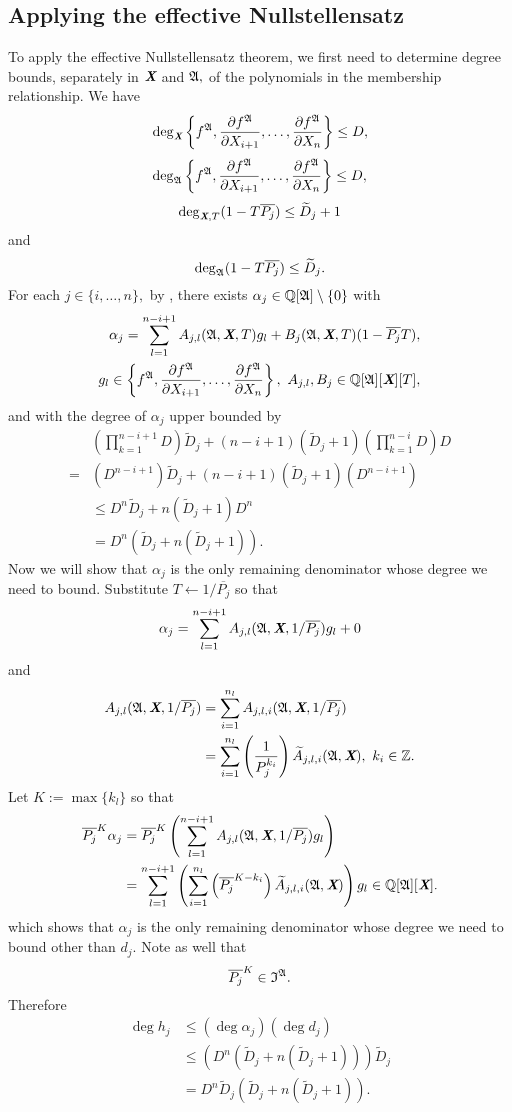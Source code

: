 \documentclass[sigconf]{acmart}
\def\Xb{\textit{\textbf{X}}}
\def\pjb{\overline{P_{j}}}
\def\Q{\mathbb{Q}}
\def\At{\widetilde{A}}
\def\Dt{\widetilde{D}}
\def\I{\frak{I}}
\def\A{\frak{A}}
\begin{document}
\subsection{Applying the effective Nullstellensatz}
%
To apply the effective Nullstellensatz theorem, we first need to determine degree bounds, separately in $\Xb$ and $\A,$ of the polynomials in the membership relationship. We have
\[
\deg_{\Xb}\left\{ 
f^\A,\frac{\partial f^\A}{\partial X_{i+1}},\hdots,\frac{\partial f^\A}{\partial X_n}
\right\}\leq D,
\]
\[
\deg_{\A}  
\left\{ 
f^\A,\frac{\partial f^\A}{\partial X_{i+1}},\hdots,\frac{\partial f^\A}{\partial X_n}
\right\} \leq D,
\]
\[
\deg_{\Xb,T}(1-T\pjb) \leq \Dt_j +1 
\]
and
\[
\deg_{\A}(1-T\pjb) \leq \Dt_j.
\]
For each $j \in \{i,\hdots,n\},$ by \cite[Theorem 0.5]{EN}, there exists $\alpha_j \in \mathbb{Q}[\A]\setminus\{0\}$ with 
%
\begin{align*}
\alpha_j = \sum_{l=1}^{n-i+1} A_{j,l}(\A,\Xb,T)g_l + B_j(\A,\Xb,T)(1-\pjb T), \\ g_l \in 
\left\{ 
f^\A,\frac{\partial f^\A}{\partial X_{i+1}},\hdots,\frac{\partial f^\A}{\partial X_n}
\right\},~ A_{j,l},B_j \in \mathbb{Q}[\A][\Xb][T],
\end{align*}
%
and with the degree of $\alpha_j$ upper bounded by
%
\begin{align*}
    &\left(\prod_{k=1}^{n-i+1} D\right)\Dt_j 
    + (n-i+1)\left(\Dt_j+1\right)\left(\prod_{k=1}^{n-i}D \right)D\\
    = &\left(D^{n-i+1}\right)\Dt_j+
    (n-i+1)\left(\Dt_j+1\right)\left(D^{n-i+1} \right)\\
    &\leq D^{n}\Dt_j + n\left(\Dt_j+1\right)D^{n}\\
    &=D^n\left(\Dt_j + n\left(\Dt_j+1\right) \right).
\end{align*}
%
Now we will show that $\alpha_j$ is the only remaining denominator whose degree we need to bound. Substitute $T \leftarrow 1/\pjb$ so that 
\[
\alpha_j = \sum_{l=1}^{n-i+1} A_{j,l}(\A,\Xb,1/\pjb)g_l + 0
\]
and
%
\begin{align*}
A_{j,l}(\A,\Xb,1/\pjb) 
&= \sum_{i=1}^{n_l} A_{j,l,i}(\A,\Xb,1/\pjb)\\
&= \sum_{i=1}^{n_l} \left(\frac{1}{P_j^{k_i}}\right)\At_{j,l,i}(\A,\Xb), ~k_i \in \mathbb{Z}.
\end{align*}
%
Let $K := \max\{k_l\}$ so that 
%
\begin{align*}
    \pjb^K \alpha_j &= \pjb^K\left(\sum_{l=1}^{n-i+1} A_{j,l}(\A,\Xb,1/\pjb)g_l\right)\\
    &= \sum_{l=1}^{n-i+1}\left( \sum_{i=1}^{n_l}\left(\pjb^{K-k_{i}}\right)\At_{j,l,i}(\A,\Xb) \right)g_l \in \Q[\A][\Xb].
\end{align*}
%
which shows that $\alpha_j$ is the only remaining denominator whose degree we need to bound other than $d_j$. Note as well that
\[
\pjb^K \in \I^{\A}.
\]
Therefore 
%
\begin{align*}
\deg h_j &\leq \left(\deg \alpha_j\right)\left(\deg d_j\right)\\
    &\leq \left(D^n\left(\Dt_j + n\left(\Dt_j+1\right) \right)\right)\Dt_j\\
    &=D^n\Dt_j\left(\Dt_j + n\left(\Dt_j+1\right) \right).
\end{align*}
%
\end{document}
